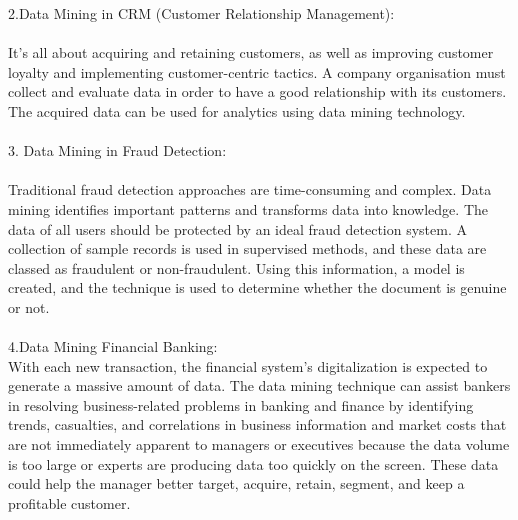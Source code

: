 \documentclass[12pt,letterpaper]{article}
\begin{document}
2.Data Mining in CRM (Customer Relationship Management):\\
\\
It's all about acquiring and retaining customers, as well as improving customer loyalty and implementing customer-centric tactics. A company organisation must collect and evaluate data in order to have a good relationship with its customers. The acquired data can be used for analytics using data mining technology.\\
\\
3. Data Mining in Fraud Detection:\\
\\
Traditional fraud detection approaches are time-consuming and complex. Data mining identifies important patterns and transforms data into knowledge. The data of all users should be protected by an ideal fraud detection system. A collection of sample records is used in supervised methods, and these data are classed as fraudulent or non-fraudulent. Using this information, a model is created, and the technique is used to determine whether the document is genuine or not.\\
\\
4.Data Mining Financial Banking:\\
With each new transaction, the financial system's digitalization is expected to generate a massive amount of data. The data mining technique can assist bankers in resolving business-related problems in banking and finance by identifying trends, casualties, and correlations in business information and market costs that are not immediately apparent to managers or executives because the data volume is too large or experts are producing data too quickly on the screen. These data could help the manager better target, acquire, retain, segment, and keep a profitable customer.
\end{document}
